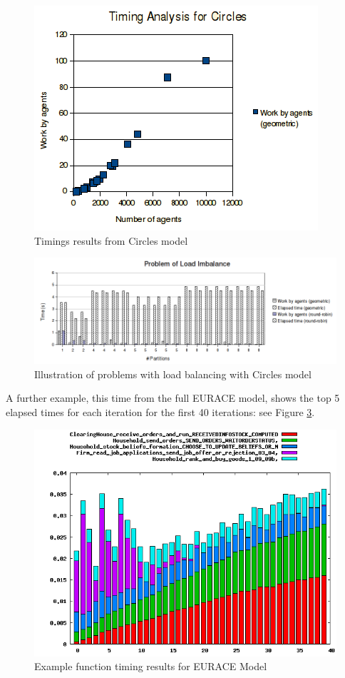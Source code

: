 \begin{figure}[h]
 \centering
  \includegraphics[scale=0.75]{circles-timings.png}
 \caption{Timings results from Circles model}
 \label{fig:circle_timings}
\end{figure}

\begin{figure}[h]
  \hspace{-10mm}
  \includegraphics[scale=0.6]{timings-problems.png}
 \caption{Illustration of problems with load balancing with Circles model}
 \label{fig:timings_problems}
\end{figure}

A further example, this time from the full EURACE model, shows the top 5 elapsed times for each iteration for the first 40 iterations: see Figure \ref{fig:timing_example}.

\begin{figure}[h]
\centering
  \hspace{-10mm}
  \includegraphics[scale=0.5]{timing_example.png}
 \caption{Example function timing results for EURACE Model}
 \label{fig:timing_example}
\end{figure}
